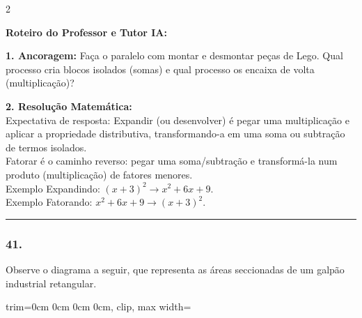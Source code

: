 \begin{multicols*}{2}
\ifgabarito
    \begin{tcolorbox}[colback=CorTitUm!5, colframe=CorTitUm, boxrule=1pt, arc=4pt, left=6pt, right=6pt, top=6pt, bottom=6pt]
    \small\textbf{\textcolor{CorTitUm}{Roteiro do Professor e Tutor IA:}}\par\vspace{0.1cm}
    \color{CinzaEscuro}
    \textbf{1. Ancoragem:} Faça o paralelo com montar e desmontar peças de Lego. Qual processo cria blocos isolados (somas) e qual processo os encaixa de volta (multiplicação)?\par\vspace{0.1cm}
    \textbf{2. Resolução Matemática:}\\
    Expectativa de resposta: Expandir (ou desenvolver) é pegar uma multiplicação e aplicar a propriedade distributiva, transformando-a em uma soma ou subtração de termos isolados.\\
    Fatorar é o caminho reverso: pegar uma soma/subtração e transformá-la num produto (multiplicação) de fatores menores.\\
    Exemplo Expandindo: $(x+3)^2 \rightarrow x^2 + 6x + 9$.\\
    Exemplo Fatorando: $x^2 + 6x + 9 \rightarrow (x+3)^2$.
    \end{tcolorbox}
\fi

\par\vspace{\espacoQuestao}

\noindent\textcolor{CorLinha}{\rule{\linewidth}{0.5pt}} 
\par\vspace{\espacoPreQuestao}
\subsubsection*{41.} 
\begin{enunciadoLiteral}
Observe o diagrama a seguir, que representa as áreas seccionadas de um galpão industrial retangular.

\begin{center}
\begin{adjustbox}{trim=0cm 0cm 0cm 0cm, clip, max width=\larguraTikz}
\end{adjustbox}
\end{center}
\end{enunciadoLiteral}
\end{multicols*}

